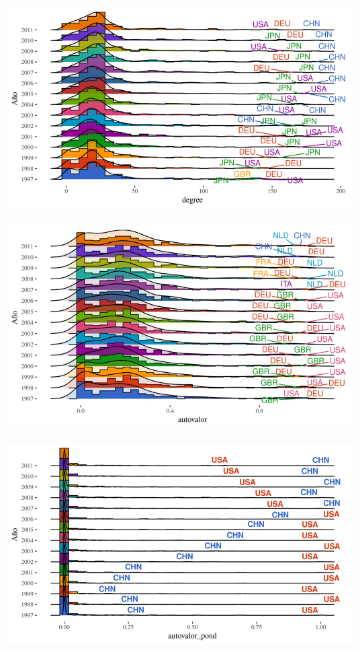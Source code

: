 \documentclass[runningheads,a4paper]{llncs}
\begin{document}
\begin{figure}%
    \begin{subfigure}{.5\linewidth}
        \centering
        \label{fig:corr-a}%
        \caption{}
        \includegraphics[width=\linewidth]{impo_densidad_degree_x_yr}
    \end{subfigure}%
    
    \begin{subfigure}{.5\linewidth}
        \centering
        \label{fig:corr-b}%
        \caption{}
        \includegraphics[width=\linewidth]{expo_densidad_autovalor_x_yr}
    \end{subfigure}

    \begin{subfigure}{.5\linewidth}
        \centering
        \label{fig:corr-c}%
        \caption{}
        \includegraphics[width=\linewidth]{expo_densidad_USAvsCHN_autovalor_pond_x_yr}%
    \end{subfigure}
    

\end{figure}
\end{document}
